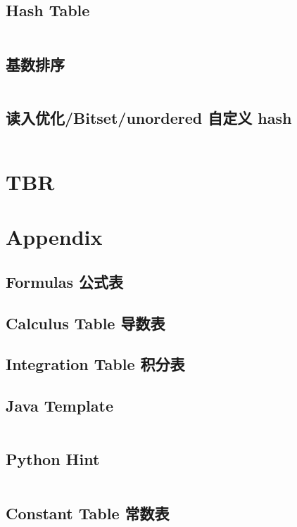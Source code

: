 \documentclass[titlepage, a4paper]{article}
\begin{document}
\begin{multicols}{2}
\begin{spacing}{0.6}
				\subsection{Hash Table}
				\inputminted{cpp}{src/DataStructure/hashmap.cpp}
				\subsection{基数排序}
				\inputminted{cpp}{src/Miscellany/RadixSort.cpp}
				\subsection{读入优化/Bitset/unordered 自定义 hash}
				\inputminted{cpp}{src/Miscellany/hack.cpp}

			\section{TBR}
				

			\section{Appendix}
				\begin{spacing}{0.5}
				\subsection{Formulas 公式表}
				
				\subsection{Calculus Table 导数表}
				
				\subsection{Integration Table 积分表}
				
				\subsection{Java Template}
				\inputminted{java}{src/Miscellany/Main.java}
				\subsection{Python Hint}
				\inputminted{python}{src/Miscellany/py.py}
				\subsection{Constant Table 常数表}
				
				\end{spacing}

\end{spacing}
\end{multicols}
\end{document}
